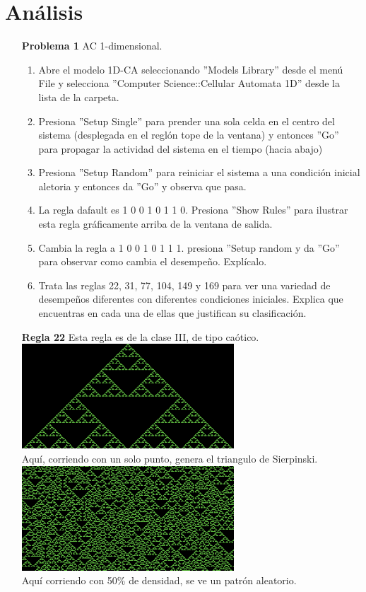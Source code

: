 \documentclass{article}
\begin{document}
\section{Análisis}
\begin{enumerate}
\item[\bf{Problema 1}] AC 1-dimensional.
\begin{enumerate}
\item Abre el modelo 1D-CA seleccionando ”Models Library” desde el menú File y selecciona ”Computer Science::Cellular Automata 1D” desde la lista de la carpeta.
\item Presiona ”Setup Single” para prender una sola celda en el centro del sistema (desplegada en el reglón tope de la ventana) y entonces ”Go” para propagar la actividad del sistema en el tiempo (hacia abajo)
\item Presiona ”Setup Random” para reiniciar el sistema a una condición inicial aletoria y entonces da ”Go” y observa que pasa.
\item La regla dafault es 1 0 0 1 0 1 1 0. Presiona ”Show Rules” para
ilustrar esta regla gráficamente arriba de la ventana de salida.
\item Cambia la regla a 1 0 0 1 0 1 1 1. presiona ”Setup random y da ”Go” para observar como cambia el desempeño. Explícalo.
\item Trata las reglas 22, 31, 77, 104, 149 y 169 para ver una variedad de desempeños diferentes con diferentes condiciones iniciales. Explica que encuentras en cada una de ellas que justifican su clasificación.
\end{enumerate}


\item[\bf{Regla 22}] Esta regla es de la clase III, de tipo caótico.\\
\includegraphics[width=300px]{22-1.png}\\
Aquí, corriendo con un solo punto, genera el triangulo de Sierpinski.
\includegraphics[width=300px]{22-50.png}\\
Aquí corriendo con 50\% de densidad, se ve un patrón aleatorio.


\end{enumerate}
\end{document}
